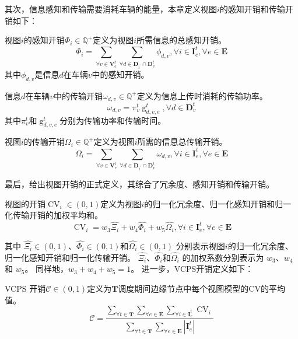 其次，信息感知和传输需要消耗车辆的能量，本章定义视图$i$的感知开销和传输开销如下：
\begin{definition}
视图$i$的感知开销$\Phi_{i} \in \mathbb{Q}^{+}$定义为视图$i$所需信息的总感知开销。
	\begin{equation}
        \Phi_{i} = \sum_{\forall v \in \mathbf{V}_{e}^{t}} \sum_{\forall d \in \mathbf{D}_{i^{\prime}} \cap \mathbf{D}_v^t}{\phi_{d, v}}, \forall i \in \mathbf{I}_{e}^t, \forall e \in \mathbf{E}
        \label{equ 4-21}
    \end{equation}
    其中$\phi_{d, v}$是信息$d$在车辆$v$中的感知开销。
\end{definition}
\begin{definition}
信息$d$在车辆$v$中的传输开销${\omega}_{d, v} \in \mathbb{Q}^{+}$定义为信息上传时消耗的传输功率。
\begin{equation}
    {\omega}_{d, v}= \pi_v^t \operatorname{g}_{d, v, e}^t, \forall d \in \mathbf{D}_v^t
\end{equation}
其中$\pi_v^t$和$\operatorname{g}_{d, v, e}^t$分别为传输功率和传输时间。
\end{definition}
\begin{definition}
视图$i$的传输开销$\Omega_{i} \in \mathbb{Q}^{+}$定义为视图$i$所需的信息总传输开销。
	\begin{equation}
        \Omega_{i} = \sum_{\forall v \in \mathbf{V}_{e}^{t}} \sum_{\forall d \in \mathbf{D}_{i^{\prime}} \cap \mathbf{D}_v^t} {\omega}_{d, v}, \forall i \in \mathbf{I}_{e}^t, \forall e \in \mathbf{E}
       	\label{equ 4-23}
    \end{equation}
\end{definition}

最后，给出视图开销的正式定义，其综合了冗余度、感知开销和传输开销。
\begin{definition}
视图的开销$\operatorname{CV}_{i} \in (0, 1)$定义为视图$i$的归一化冗余度、归一化感知开销和归一化传输开销的加权平均和。
	\begin{equation}
	    \operatorname{CV}_{i} = w_3  \hat{\Xi_{i}} +  w_4 \hat{\Phi_{i}} + w_5 \hat{\Omega_{i}}, \forall i \in \mathbf{I}_{e}^t, \forall e \in \mathbf{E}
	\end{equation}
\end{definition}
\noindent 其中 $\hat{\Xi_{i}}\in (0, 1)$、$\hat{\Phi_{i}} \in (0, 1)$和$\hat{\Omega_{i}} \in (0, 1)$ 分别表示视图$i$的归一化冗余度、归一化感知开销和归一化传输开销。
$\hat{\Xi_{i}}$、$\hat{\Phi_{i}}$和$\hat{\Omega_{i}}$ 的加权系数分别表示为 $w_3$、$w_4$和 $w_5$。
同样地，$w_3+w_4+w_5=1$。
进一步，VCPS开销定义如下：
\begin{definition}
VCPS 开销$\mathscr{C} \in (0, 1)$定义为$\mathbf{T}$调度期间边缘节点中每个视图模型的CV的平均值。
	\begin{equation}
		\mathscr{C}=\frac{\sum_{\forall t \in \mathbf{T}} \sum_{\forall e \in \mathbf{E}} \sum_{\forall i \in \mathbf{I}_e^t}  \operatorname{CV}_{i}}{\sum_{\forall t \in \mathbf{T}} \sum_{\forall e \in \mathbf{E}} |\mathbf{I}_e^t| }
	\end{equation}
\end{definition}

